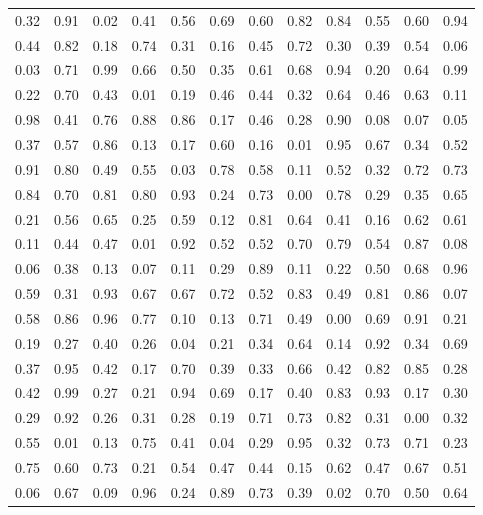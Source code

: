 \begin{center}
\begin{tabular}{llllllllllll}
0.32 & 0.91 & 0.02 & 0.41 & 0.56 & 0.69 & 0.60 & 0.82 & 0.84 & 0.55 & 0.60 & 0.94 \\
0.44 & 0.82 & 0.18 & 0.74 & 0.31 & 0.16 & 0.45 & 0.72 & 0.30 & 0.39 & 0.54 & 0.06 \\
0.03 & 0.71 & 0.99 & 0.66 & 0.50 & 0.35 & 0.61 & 0.68 & 0.94 & 0.20 & 0.64 & 0.99 \\
0.22 & 0.70 & 0.43 & 0.01 & 0.19 & 0.46 & 0.44 & 0.32 & 0.64 & 0.46 & 0.63 & 0.11 \\
0.98 & 0.41 & 0.76 & 0.88 & 0.86 & 0.17 & 0.46 & 0.28 & 0.90 & 0.08 & 0.07 & 0.05 \\
0.37 & 0.57 & 0.86 & 0.13 & 0.17 & 0.60 & 0.16 & 0.01 & 0.95 & 0.67 & 0.34 & 0.52 \\
0.91 & 0.80 & 0.49 & 0.55 & 0.03 & 0.78 & 0.58 & 0.11 & 0.52 & 0.32 & 0.72 & 0.73 \\
0.84 & 0.70 & 0.81 & 0.80 & 0.93 & 0.24 & 0.73 & 0.00 & 0.78 & 0.29 & 0.35 & 0.65 \\
0.21 & 0.56 & 0.65 & 0.25 & 0.59 & 0.12 & 0.81 & 0.64 & 0.41 & 0.16 & 0.62 & 0.61 \\
0.11 & 0.44 & 0.47 & 0.01 & 0.92 & 0.52 & 0.52 & 0.70 & 0.79 & 0.54 & 0.87 & 0.08 \\
0.06 & 0.38 & 0.13 & 0.07 & 0.11 & 0.29 & 0.89 & 0.11 & 0.22 & 0.50 & 0.68 & 0.96 \\
0.59 & 0.31 & 0.93 & 0.67 & 0.67 & 0.72 & 0.52 & 0.83 & 0.49 & 0.81 & 0.86 & 0.07 \\
0.58 & 0.86 & 0.96 & 0.77 & 0.10 & 0.13 & 0.71 & 0.49 & 0.00 & 0.69 & 0.91 & 0.21 \\
0.19 & 0.27 & 0.40 & 0.26 & 0.04 & 0.21 & 0.34 & 0.64 & 0.14 & 0.92 & 0.34 & 0.69 \\
0.37 & 0.95 & 0.42 & 0.17 & 0.70 & 0.39 & 0.33 & 0.66 & 0.42 & 0.82 & 0.85 & 0.28 \\
0.42 & 0.99 & 0.27 & 0.21 & 0.94 & 0.69 & 0.17 & 0.40 & 0.83 & 0.93 & 0.17 & 0.30 \\
0.29 & 0.92 & 0.26 & 0.31 & 0.28 & 0.19 & 0.71 & 0.73 & 0.82 & 0.31 & 0.00 & 0.32 \\
0.55 & 0.01 & 0.13 & 0.75 & 0.41 & 0.04 & 0.29 & 0.95 & 0.32 & 0.73 & 0.71 & 0.23 \\
0.75 & 0.60 & 0.73 & 0.21 & 0.54 & 0.47 & 0.44 & 0.15 & 0.62 & 0.47 & 0.67 & 0.51 \\
0.06 & 0.67 & 0.09 & 0.96 & 0.24 & 0.89 & 0.73 & 0.39 & 0.02 & 0.70 & 0.50 & 0.64
\end{tabular}
\end{center}

